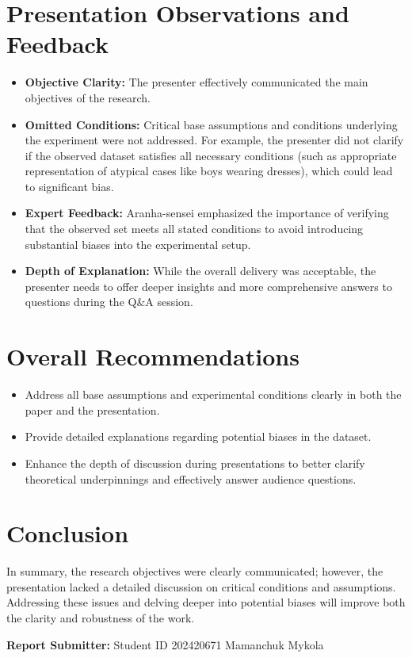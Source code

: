 \documentclass[12pt]{article}
\begin{document}
\section*{Presentation Observations and Feedback}
\begin{itemize}[leftmargin=1.5em]
    \item \textbf{Objective Clarity:} The presenter effectively communicated the main objectives of the research.
    \item \textbf{Omitted Conditions:} Critical base assumptions and conditions underlying the experiment were not addressed. For example, the presenter did not clarify if the observed dataset satisfies all necessary conditions (such as appropriate representation of atypical cases like boys wearing dresses), which could lead to significant bias.
    \item \textbf{Expert Feedback:} Aranha-sensei emphasized the importance of verifying that the observed set meets all stated conditions to avoid introducing substantial biases into the experimental setup.
    \item \textbf{Depth of Explanation:} While the overall delivery was acceptable, the presenter needs to offer deeper insights and more comprehensive answers to questions during the Q\&A session.
\end{itemize}

\section*{Overall Recommendations}
\begin{itemize}[leftmargin=1.5em]
    \item Address all base assumptions and experimental conditions clearly in both the paper and the presentation.
    \item Provide detailed explanations regarding potential biases in the dataset.
    \item Enhance the depth of discussion during presentations to better clarify theoretical underpinnings and effectively answer audience questions.
\end{itemize}

\section*{Conclusion}
In summary, the research objectives were clearly communicated; however, the presentation lacked a detailed discussion on critical conditions and assumptions. Addressing these issues and delving deeper into potential biases will improve both the clarity and robustness of the work.

\bigskip
\noindent\textbf{Report Submitter:} Student ID 202420671 Mamanchuk Mykola
\end{document}
